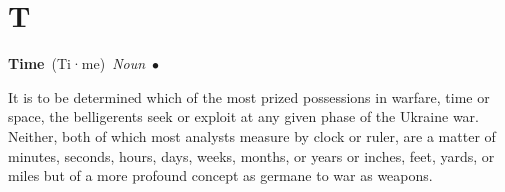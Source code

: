 \documentclass[10pt,a4paper,twoside]{article} %
\newcommand{\entry}[4]{\markboth{#1}{#1}\textbf{#1}\ {(#2)}\ \textit{#3}\ $\bullet$\ {#4}}  %
\begin{document}

\section*{T}

\begin{multicols}{2}

\entry{Time} {Ti·me} {Noun} {

It is to be determined which of the most prized possessions in warfare, time or space, the belligerents seek or exploit at any given phase of the Ukraine war. Neither, both of which most analysts measure by clock or ruler, are a matter of minutes, seconds, hours, days, weeks, months, or years or inches, feet, yards, or miles but of a more profound concept as germane to war as weapons. 

}


\end{multicols}

\end{document}
